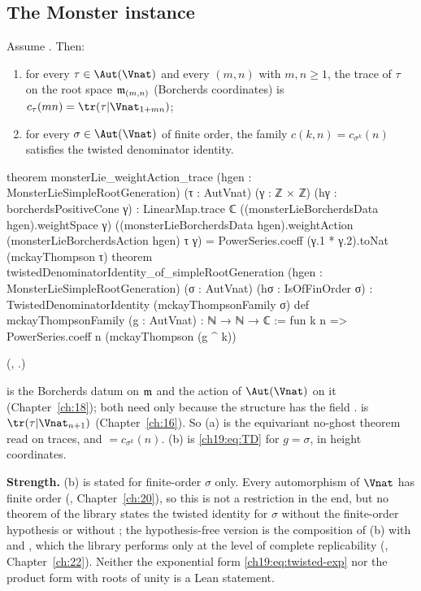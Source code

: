 \subsection{The Monster instance}

\begin{theorem}\label{ch19:thm:twistedmonster}
Assume .  Then:
\begin{enumerate}[label=(\alph*)]
\item for every $\tau\in\Aut(\Vnat)$ and every $(m,n)$ with $m,n\ge1$, the trace of $\tau$ on the root space $\mathfrak{m}_{(m,n)}$ (Borcherds
  coordinates) is $c_\tau(mn)=\tr(\tau|\Vnat_{1+mn})$;
\item for every $\sigma\in\Aut(\Vnat)$ of finite order, the family $c(k,n)=c_{\sigma^k}(n)$ satisfies the twisted denominator identity.
\end{enumerate}
\end{theorem}
\begin{leancode}
theorem monsterLie_weightAction_trace (hgen : MonsterLieSimpleRootGeneration) (τ : AutVnat)
    (γ : ℤ × ℤ) (hγ : borcherdsPositiveCone γ) :
    LinearMap.trace ℂ ((monsterLieBorcherdsData hgen).weightSpace γ)
        ((monsterLieBorcherdsData hgen).weightAction (monsterLieBorcherdsAction hgen) τ γ) =
      PowerSeries.coeff (γ.1 * γ.2).toNat (mckayThompson τ)
theorem twistedDenominatorIdentity_of_simpleRootGeneration (hgen : MonsterLieSimpleRootGeneration)
    (σ : AutVnat) (hσ : IsOfFinOrder σ) : TwistedDenominatorIdentity (mckayThompsonFamily σ)
def mckayThompsonFamily (g : AutVnat) : ℕ → ℕ → ℂ :=
  fun k n => PowerSeries.coeff n (mckayThompson (g ^ k))
\end{leancode}
(, .)
\begin{dictionary}
 is the Borcherds datum on $\mathfrak{m}$ and  the action of
$\Aut(\Vnat)$ on it (Chapter~\ref{ch:18}); both need  only because the structure  has the field
.   is $\tr(\tau|\Vnat_{n+1})$ (Chapter~\ref{ch:16}).  So (a) is the
equivariant no-ghost theorem read on traces, and  $=c_{\sigma^k}(n)$.  (b) is
\eqref{ch19:eq:TD} for $g=\sigma$, in height coordinates.

\textbf{Strength.}  (b) is stated for finite-order $\sigma$ only.  Every automorphism of $\Vnat$ has finite order
(, Chapter~\ref{ch:20}), so this is not a restriction in the end, but no theorem of the library
states the twisted identity for $\sigma$ without the finite-order hypothesis or without ; the hypothesis-free
version is the composition of (b) with  and , which
the library performs only at the level of complete replicability (, Chapter~\ref{ch:22}).
Neither the exponential form \eqref{ch19:eq:twisted-exp} nor the product form with roots of unity is a Lean statement.
\end{dictionary}
